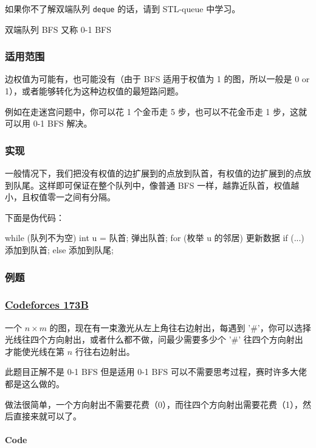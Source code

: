 如果你不了解双端队列 \texttt{deque} 的话，请到 STL-queue 中学习。

双端队列 BFS 又称 0-1 BFS

\subsubsection{适用范围}

边权值为可能有，也可能没有（由于 BFS 适用于权值为 1 的图，所以一般是 0 or 1），或者能够转化为这种边权值的最短路问题。

例如在走迷宫问题中，你可以花 1 个金币走 5 步，也可以不花金币走 1 步，这就可以用 0-1 BFS 解决。

\subsubsection{实现}

一般情况下，我们把没有权值的边扩展到的点放到队首，有权值的边扩展到的点放到队尾。这样即可保证在整个队列中，像普通 BFS 一样，越靠近队首，权值越小，且权值零一之间有分隔。

下面是伪代码：

\begin{cppcode}
while (队列不为空) {
  int u = 队首;
  弹出队首;
  for (枚举 u 的邻居) {
    更新数据
    if (...)
      添加到队首;
    else
      添加到队尾;
  }
}
\end{cppcode}

\subsubsection{例题}

\subsubsection{\href{http://codeforces.com/problemset/problem/173/B}{Codeforces 173B}}

一个 $n \times m$ 的图，现在有一束激光从左上角往右边射出，每遇到 '\#'，你可以选择光线往四个方向射出，或者什么都不做，问最少需要多少个 '\#' 往四个方向射出才能使光线在第 $n$ 行往右边射出。

此题目正解不是 0-1 BFS 但是适用 0-1 BFS 可以不需要思考过程，赛时许多大佬都是这么做的。

做法很简单，一个方向射出不需要花费（0），而往四个方向射出需要花费（1），然后直接来就可以了。

\paragraph{Code}


